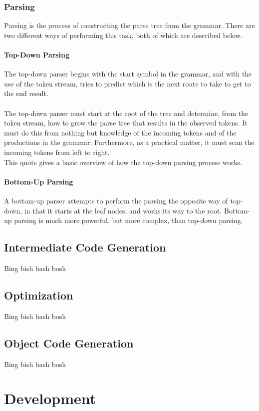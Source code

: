 \documentclass[12pt]{report}
\begin{document}
\subsubsection{Parsing}\label{subsec:parsing}
Parsing is the process of constructing the parse tree from the grammar.  There are two different ways of performing this task, both of which are described below.
\paragraph{Top-Down Parsing}
The top-down parser begins with the start symbol in the grammar, and with the use of the token stream, tries to predict which is the next route to take to get to the end result.\\
\\
The top-down parser must start at the root of the tree and determine, from the token stream, how to grow the parse tree that results in the observed tokens.  It must do this from nothing but knowledge of the incoming tokens and of the productions in the grammar.  Furthermore, as a practical matter, it must scan the incoming tokens from left to right. \citep{compilerconstruction92}
\\
This quote gives a basic overview of how the top-down parsing process works.
\paragraph{Bottom-Up Parsing}
A bottom-up parser attempts to perform the parsing the opposite way of top-down, in that it starts at the leaf nodes, and works its way to the root.  Bottom-up parsing is much more powerful, but more complex, than top-down parsing.
\subsection{Intermediate Code Generation}\label{subsec:intermediate_code_gen}
Bing bish bash bosh
\subsection{Optimization}\label{subsec:optimization}
Bing bish bash bosh
\subsection{Object Code Generation}\label{subsec:object_code_gen}
Bing bish bash bosh

\section{Development}\label{sec:development}
\end{document}
